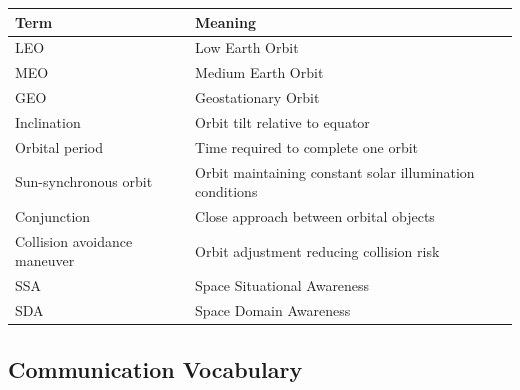 \documentclass[10pt,a4paper,twocolumn]{article}
\begin{document}
\begin{tabularx}{\columnwidth}{lX}
    \toprule
    Term                         & Meaning                                                  \\
    \midrule
    LEO                          & Low Earth Orbit                                          \\
    MEO                          & Medium Earth Orbit                                       \\
    GEO                          & Geostationary Orbit                                      \\
    Inclination                  & Orbit tilt relative to equator                           \\
    Orbital period               & Time required to complete one orbit                      \\
    Sun-synchronous orbit        & Orbit maintaining constant solar illumination conditions \\
    Conjunction                  & Close approach between orbital objects                   \\
    Collision avoidance maneuver & Orbit adjustment reducing collision risk                 \\
    SSA                          & Space Situational Awareness                              \\
    SDA                          & Space Domain Awareness                                   \\
    \bottomrule
\end{tabularx}


\subsection{Communication Vocabulary}
\end{document}
